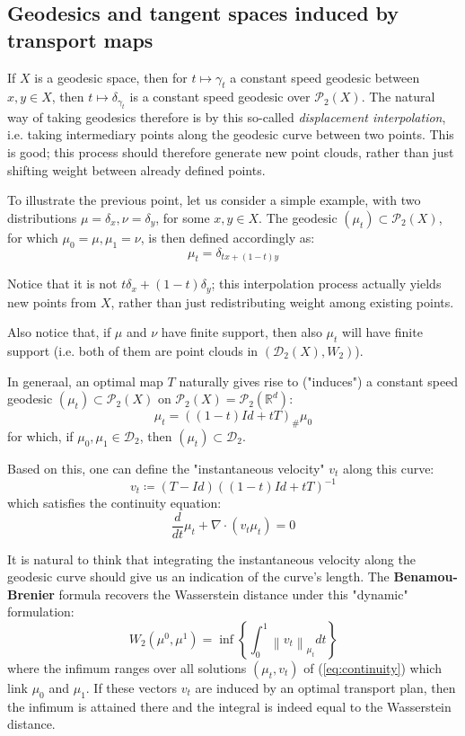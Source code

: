 \documentclass{article}
\newcommand{\norm}[1]{\left\lVert#1\right\rVert}
\begin{document}
\subsection{Geodesics and tangent spaces induced by transport maps}

If $X$ is a geodesic space, then for $t\mapsto \gamma_t$ a constant speed
geodesic between $x,y\in X$, then $t\mapsto \delta_{\gamma_t}$ is a 
constant speed geodesic over $\mathscr{P}_2(X)$. The natural way of 
taking geodesics therefore is by this so-called \textit{displacement 
interpolation}, i.e. taking intermediary points along the geodesic 
curve between two points. This is good; this process should therefore
generate new point clouds, rather than just shifting weight between
already defined points.

To illustrate the previous point, let us consider a simple example, with
two distributions $\mu = \delta_x, \nu = \delta_y$, for some $x, y\in X$. 
The geodesic $(\mu_t) \subset \mathscr{P}_2(X)$, for which $\mu_0 = \mu, 
\mu_1 = \nu$, is then defined accordingly as:
\[\mu_t = \delta_{tx + (1-t)y} \]

Notice that it is not $t\delta_x + (1-t)\delta_y$; this interpolation
process actually yields new points from $X$, rather than just 
redistributing weight among existing points.

Also notice that, if $\mu$ and $\nu$ have finite support, then also 
$\mu_t$ will have finite support (i.e. both of them are point clouds 
in $(\mathscr{D}_2(X), W_2)$).

In generaal, an optimal map $T$ naturally gives rise to ("induces") 
a constant speed geodesic $(\mu_t)\subset \mathscr{P}_2(X)$
on $\mathscr{P}_2(X) = \mathscr{P}_2(\mathbb{R}^d)$:
\[\mu_t = ((1-t)Id + tT)_\#\mu_0 \]
for which, if $\mu_0, \mu_1\in \mathscr{D}_2$, then $(\mu_t)\subset\mathscr{D}_2$.

Based on this, one can define the "instantaneous velocity" $v_t$ 
along this curve:
\[ v_t\coloneqq (T-Id)((1-t)Id + tT)^{-1}\]
which satisfies the continuity equation:
\begin{equation}
    \label{eq:continuity}
    \frac{d}{dt}\mu_t + \nabla \cdot (v_t\mu_t) = 0
\end{equation}

It is natural to think that integrating the instantaneous velocity along 
the geodesic curve should give us an indication of the curve's length.
The \textbf{Benamou-Brenier} formula recovers the Wasserstein distance
under this "dynamic" formulation:
\[W_2(\mu^0, \mu^1) = \inf\left\{ \int_0^1\norm{v_t}_{\mu_t}dt\right\} \]
where the infimum ranges over all solutions $(\mu_t, v_t)$ of (\ref{eq:continuity})
which link $\mu_0$ and $\mu_1$. If these vectors $v_t$ are induced by an
optimal transport plan, then the infimum is attained there and the 
integral is indeed equal to the Wasserstein distance.
\end{document}
